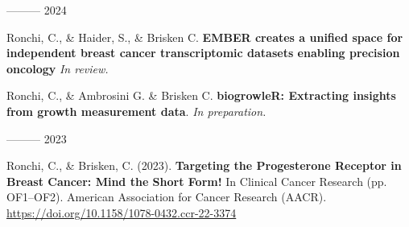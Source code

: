 

\begin{cventries}

\cventry
  {---------}
  {2024} %
  {}{}
  {
    \begin{cvitems} %
      \item {Ronchi, C., \& Haider, S., \& Brisken C. \textbf{EMBER creates a unified space for independent breast cancer transcriptomic datasets enabling precision oncology} \textit{In review.}}
      \item {Ronchi, C., \& Ambrosini G. \& Brisken C. \textbf{biogrowleR: Extracting insights 
             from growth measurement data}. \textit{In preparation.}}
    \end{cvitems}
  }

\cventry
  {---------}
  {2023} %
  {}{}
  {
    \begin{cvitems} %
      \item {Ronchi, C., \& Brisken, C. (2023). \textbf{Targeting the Progesterone Receptor 
             in Breast Cancer: Mind the Short Form!} In Clinical Cancer Research
             (pp. OF1–OF2). American Association for Cancer Research (AACR). 
             \url{https://doi.org/10.1158/1078-0432.ccr-22-3374}}
    \end{cvitems}
  }

\end{cventries}
